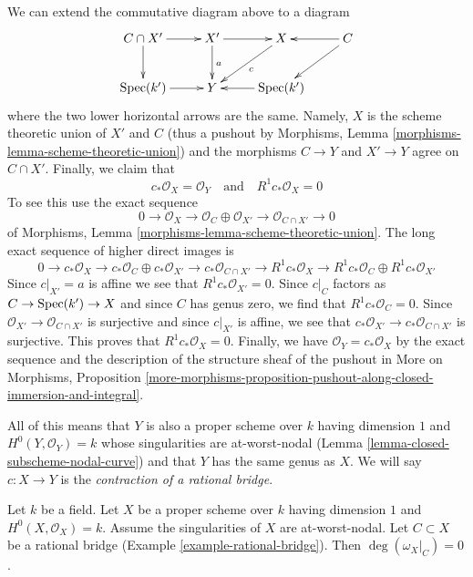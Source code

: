 \begin{example}
\medskip\noindent
We can extend the commutative diagram above to a diagram
$$
\xymatrix{
C \cap X' \ar[r] \ar[d] &
X' \ar[d]^a \ar[r] & X \ar[ld]^c &
C \ar[ld] \ar[l] \\
\Spec(k') \ar[r] &
Y &
\Spec(k') \ar[l]
}
$$
where the two lower horizontal arrows are the same. Namely, $X$ is the
scheme theoretic union of $X'$ and $C$ (thus a pushout by
Morphisms, Lemma \ref{morphisms-lemma-scheme-theoretic-union})
and the morphisms $C \to Y$ and $X' \to Y$ agree on $C \cap X'$.
Finally, we claim that
$$
c_*\mathcal{O}_X = \mathcal{O}_Y
\quad\text{and}\quad
R^1c_*\mathcal{O}_X = 0
$$
To see this use the exact sequence
$$
0 \to \mathcal{O}_X \to
\mathcal{O}_C \oplus \mathcal{O}_{X'} \to
\mathcal{O}_{C \cap X'} \to 0
$$
of Morphisms, Lemma \ref{morphisms-lemma-scheme-theoretic-union}.
The long exact sequence of higher direct images is
$$
0 \to c_*\mathcal{O}_X \to c_*\mathcal{O}_C \oplus c_*\mathcal{O}_{X'} \to
c_*\mathcal{O}_{C \cap X'} \to
R^1c_*\mathcal{O}_X \to
R^1c_*\mathcal{O}_C \oplus R^1c_*\mathcal{O}_{X'}
$$
Since $c|_{X'} = a$ is affine we see that
$R^1c_*\mathcal{O}_{X'} = 0$.
Since $c|_C$ factors as $C \to \mathop{\mathrm{Spec}}(k') \to X$ and since
$C$ has genus zero, we find that $R^1c_*\mathcal{O}_C = 0$.
Since $\mathcal{O}_{X'} \to \mathcal{O}_{C \cap X'}$ is
surjective and since $c|_{X'}$ is affine, we see that
$c_*\mathcal{O}_{X'} \to c_*\mathcal{O}_{C \cap X'}$
is surjective. This proves that $R^1c_*\mathcal{O}_X = 0$.
Finally, we have
$\mathcal{O}_Y = c_*\mathcal{O}_X$ by
the exact sequence and
the description of the structure sheaf of the pushout
in More on Morphisms, Proposition
\ref{more-morphisms-proposition-pushout-along-closed-immersion-and-integral}.

\medskip\noindent
All of this means that $Y$ is also a proper scheme over $k$
having dimension $1$ and $H^0(Y, \mathcal{O}_Y) = k$
whose singularities are at-worst-nodal
(Lemma \ref{lemma-closed-subscheme-nodal-curve})
and that $Y$ has the same genus as $X$.
We will say $c : X \to Y$ is the
{\it contraction of a rational bridge}.
\end{example}

\begin{lemma}
\label{lemma-rational-bridge-zero}
Let $k$ be a field. Let $X$ be a proper scheme over $k$ having dimension $1$
and $H^0(X, \mathcal{O}_X) = k$. Assume the singularities of $X$ are
at-worst-nodal. Let $C \subset X$ be a rational bridge
(Example \ref{example-rational-bridge}). Then $\deg(\omega_X|_C) = 0$.
\end{lemma}

